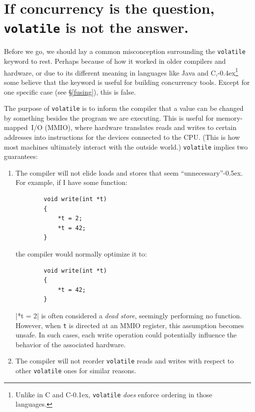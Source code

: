 \documentclass[fontsize=10pt, oneside]{scrartcl}
\newcommand{\codesize}{\fontsize{\bodyfontsize}{\bodybaselineskip}}
\newcommand{\punckern}{\kern-0.4ex}
\newcommand{\quotekern}{\kern-0.5ex}
\newcommand{\monobox}[1]{\mbox{\texttt{#1}}}
\newcommand{\keyword}[1]{\monobox{\color{darkGreen}#1}}
\newcommand{\cplusplus}[1]{C\kern-0.1ex\raisebox{0.15ex}{\texttt{++}}}
\newcommand{\clang}[1]{C}
\newcommand{\csharp}{C\raisebox{0.25ex}{\#}}
\newcommand{\introduce}[1]{\textit{#1}}
\newcommand{\secref}[1]{\hyperref[#1]{\textsc{\S}\ref*{#1}}}
\begin{document}
\section{If concurrency is the question, \texttt{volatile} is not the answer.}

Before we go, we should lay a common misconception surrounding the \keyword{volatile} keyword to rest.
Perhaps because of how it worked in older compilers and hardware,
or due to its different meaning in languages like Java and \csharp,\punckern\footnote{Unlike in \clang{} and \cplusplus{},
\keyword{volatile} \emph{does} enforce ordering in those languages.}
some believe that the keyword is useful for building concurrency tools.
Except for one specific case (see \secref{fusing}), this is false.

The purpose of \keyword{volatile} is to inform the compiler that a value can be changed by something besides the program we are executing.
This is useful for memory-mapped~\textsc{I/O} (\textsc{MMIO}),
where hardware translates reads and writes to certain addresses into instructions for the devices connected to the \textsc{CPU}.
(This is how most machines ultimately interact with the outside world.)
\keyword{volatile} implies two guarantees:
\begin{enumerate}
  \item The compiler will not elide loads and stores that seem ``unnecessary''\quotekern.
        For example, if I have some function:
        \begin{verbatim}
        void write(int *t)
        {
            *t = 2;
            *t = 42;
        }
        \end{verbatim}
        the compiler would normally optimize it to:
        \begin{verbatim}
        void write(int *t)
        {
            *t = 42;
        }
        \end{verbatim}
        \cpp|*t = 2| is often considered a \introduce{dead store},
        seemingly performing no function.
        However, when \texttt{t} is directed at an \textsc{MMIO} register,
        this assumption becomes unsafe.
        In such cases, each write operation could potentially influence the behavior of the associated hardware.

  \item The compiler will not reorder \keyword{volatile} reads and writes with respect to other \keyword{volatile} ones for similar reasons.
\end{enumerate}
\end{document}
